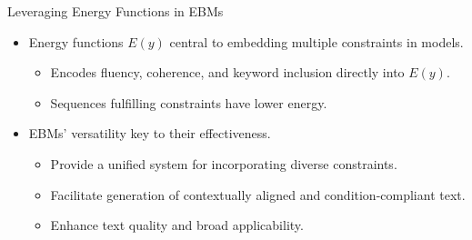 \documentclass{beamer}
\begin{document}
\begin{frame}{Leveraging Energy Functions in EBMs}
    \begin{itemize}
        \item Energy functions $E(y)$ central to embedding multiple constraints in models.
              \begin{itemize}
                  \item Encodes fluency, coherence, and keyword inclusion directly into $E(y)$.
                  \item Sequences fulfilling constraints have lower energy.
              \end{itemize}
        \item EBMs' versatility key to their effectiveness.
              \begin{itemize}
                  \item Provide a unified system for incorporating diverse constraints.
                  \item Facilitate generation of contextually aligned and condition-compliant text.
                  \item Enhance text quality and broad applicability.
              \end{itemize}
    \end{itemize}
\end{frame}
\end{document}
